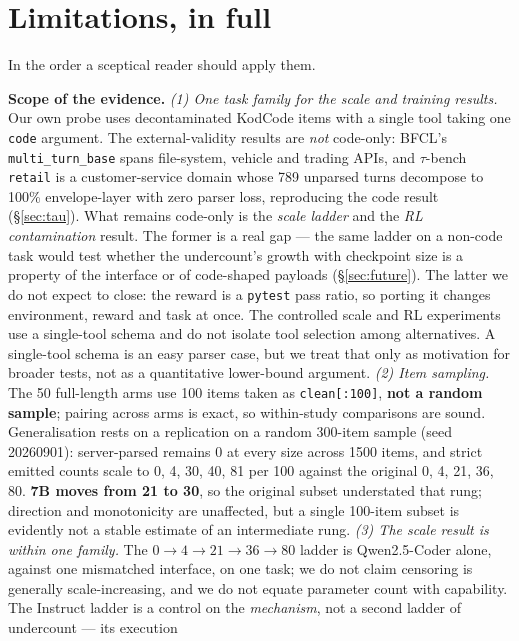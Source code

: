 \section{Limitations, in full}
\label{app:limitations}

In the order a sceptical reader should apply them.

\textbf{Scope of the evidence.}
\emph{(1) One task family for the scale and training results.} Our own probe uses decontaminated
KodCode items with a single tool taking one \texttt{code} argument. The external-validity results
are \emph{not} code-only: BFCL's \texttt{multi\_turn\_base} spans file-system, vehicle and trading
APIs, and $\tau$-bench \texttt{retail} is a customer-service domain whose 789 unparsed turns
decompose to 100\% envelope-layer with zero parser loss, reproducing the code result
(\S\ref{sec:tau}). What remains code-only is the \emph{scale ladder} and the \emph{RL
contamination} result. The former is a real gap --- the same ladder on a non-code task would test
whether the undercount's growth with checkpoint size is a property of the interface or of
code-shaped payloads (\S\ref{sec:future}). The latter we do not expect to close: the reward is a
\texttt{pytest} pass ratio, so porting it changes environment, reward and task at once. The controlled
scale and RL experiments use a single-tool schema and do not isolate tool selection among
alternatives. A single-tool schema is
an easy parser case, but we treat that only as motivation for broader tests, not as a quantitative
lower-bound argument.
\emph{(2) Item sampling.} The 50 full-length arms use 100 items taken as \texttt{clean[:100]},
\textbf{not a random sample}; pairing across arms is exact, so within-study comparisons are sound.
Generalisation rests on a replication on a random 300-item sample (seed 20260901): server-parsed
remains 0 at every size across 1500 items, and strict emitted counts scale to 0, 4, 30, 40, 81 per
100 against the original 0, 4, 21, 36, 80. \textbf{7B moves from 21 to 30}, so the original subset
understated that rung; direction and monotonicity are unaffected, but a single 100-item subset is
evidently not a stable estimate of an intermediate rung.
\emph{(3) The scale result is within one family.} The $0\to4\to21\to36\to80$ ladder is
Qwen2.5-Coder alone, against one mismatched interface, on one task; we do not claim censoring is
generally scale-increasing, and we do not equate parameter count with capability. The Instruct
ladder is a control on the \emph{mechanism}, not a second ladder of undercount --- its execution
